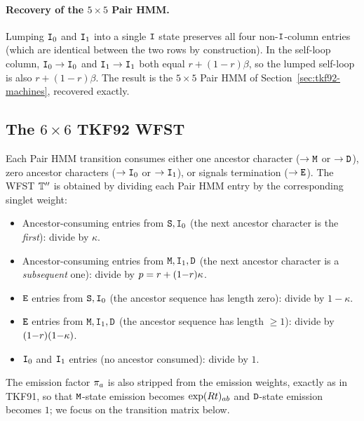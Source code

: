 \paragraph{Recovery of the $5{\times}5$ Pair HMM.}
Lumping ${\tt I}_0$ and ${\tt I}_1$ into a single ${\tt I}$ state preserves
all four non-${\tt I}$-column entries (which are identical between the
two rows by construction).  In the self-loop column,
${\tt I}_0\to{\tt I}_0$ and ${\tt I}_1\to{\tt I}_1$ both equal $r+(1{-}r)\beta$,
so the lumped self-loop is also $r+(1{-}r)\beta$.  The result is the
$5{\times}5$ Pair HMM of Section~\ref{sec:tkf92-machines}, recovered
exactly.

\subsection{The \texorpdfstring{$6{\times}6$}{6x6} TKF92 WFST}
\label{sec:wfst92-6x6}

Each Pair HMM transition consumes either one ancestor character
($\to{\tt M}$ or $\to{\tt D}$), zero ancestor characters
($\to{\tt I}_0$ or $\to{\tt I}_1$), or signals termination ($\to{\tt E}$).
The WFST $\mathbb{T}''$ is obtained by dividing each Pair HMM
entry by the corresponding singlet weight:

\begin{itemize}[nosep]
\item Ancestor-consuming entries from ${\tt S},{\tt I}_0$
  (the next ancestor character is the \emph{first}):
  divide by $\kappa$.
\item Ancestor-consuming entries from ${\tt M},{\tt I}_1,{\tt D}$
  (the next ancestor character is a \emph{subsequent} one):
  divide by $p = r + (1{-}r)\kappa$.
\item ${\tt E}$ entries from ${\tt S},{\tt I}_0$
  (the ancestor sequence has length zero):
  divide by $1{-}\kappa$.
\item ${\tt E}$ entries from ${\tt M},{\tt I}_1,{\tt D}$
  (the ancestor sequence has length $\geq 1$):
  divide by $(1{-}r)(1{-}\kappa)$.
\item ${\tt I}_0$ and ${\tt I}_1$ entries (no ancestor consumed): divide by $1$.
\end{itemize}

The emission factor $\pi_a$ is also stripped from the emission
weights, exactly as in TKF91, so that ${\tt M}$-state emission becomes
$\exp(Rt)_{ab}$ and ${\tt D}$-state emission
becomes $1$; we focus on the transition matrix below.

